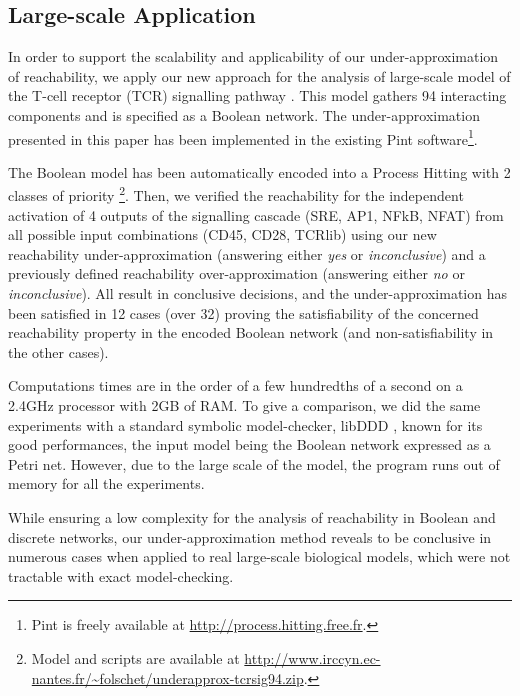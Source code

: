 \subsection{Large-scale Application}

In order to support the scalability and applicability of our under-approximation of reachability, we
apply our new approach for the analysis of large-scale model of the T-cell receptor (TCR)
signalling pathway \cite{tcrsig94}.
This model gathers 94 interacting components and is specified as a Boolean network.
The under-approximation presented in this paper has been implemented in the existing Pint
software\footnote{Pint is freely available at \url{http://process.hitting.free.fr}.}.

The Boolean model has been automatically encoded into a Process Hitting with 2 classes of priority%
\footnote{Model and scripts are available at
\url{http://www.irccyn.ec-nantes.fr/~folschet/underapprox-tcrsig94.zip}.}.
Then, we verified the reachability for the independent activation of 4 outputs of the signalling
cascade (SRE, AP1, NFkB, NFAT) from all possible input combinations (CD45, CD28, TCRlib) using our
new reachability under-approximation (answering either \emph{yes} or \emph{inconclusive}) and a 
previously defined reachability over-approximation \cite{PMR12-MSCS} (answering either \emph{no} or
\emph{inconclusive}).
All result in conclusive decisions, and the under-approximation has been satisfied in 12 cases (over
32) proving the satisfiability of the concerned reachability property in the encoded Boolean network
(and non-satisfiability in the other cases).

Computations times are in the order of a few hundredths of a second on a 2.4GHz processor with 2GB
of RAM.
To give a comparison, we did the same experiments with a standard symbolic model-checker, libDDD
\cite{libddd}, known for its good performances, the input model being the Boolean network expressed
as a Petri net.
However, due to the large scale of the model, the program runs out of memory for all the experiments.

While ensuring a low complexity for the analysis of reachability in Boolean and discrete networks, our
under-approximation method reveals to be conclusive in numerous cases when applied to real
large-scale biological models, which were not tractable with exact model-checking.

